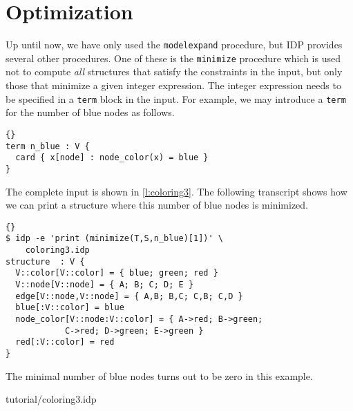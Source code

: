 \documentclass{article}
\newcommand{\idp}{{\sc IDP}\xspace}
\begin{document}
\section{Optimization}

Up until now, we have only used the \texttt{modelexpand} procedure,
but \idp provides several other procedures.
One of these is the \texttt{minimize} procedure which is used not to compute
\emph{all} structures that satisfy the constraints in the input,
but only those that minimize a given integer expression.
The integer expression needs to be specified in a \texttt{term} block
in the input.
For example, we may introduce a \texttt{term} for the number
of blue nodes as follows.
\begin{lstlisting}{}
term n_blue : V {
  card { x[node] : node_color(x) = blue } 
}
\end{lstlisting}
The complete input is shown in \autoref{l:coloring3}.
The following transcript shows how we can print a
structure where this number of blue nodes is minimized.
\begin{lstlisting}{}
$ idp -e 'print (minimize(T,S,n_blue)[1])' \
	coloring3.idp 
structure  : V {
  V::color[V::color] = { blue; green; red }
  V::node[V::node] = { A; B; C; D; E }
  edge[V::node,V::node] = { A,B; B,C; C,B; C,D }
  blue[:V::color] = blue
  node_color[V::node:V::color] = { A->red; B->green;
			C->red; D->green; E->green }
  red[:V::color] = red
}
\end{lstlisting}
The minimal number of blue nodes turns out to be zero in this example.


	{tutorial/coloring3.idp}
\end{document}
